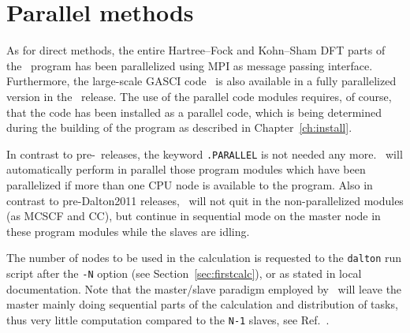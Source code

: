 \section{Parallel methods}\label{sec:parallel}

\begin{center}
\end{center}

As for direct methods, the entire Hartree--Fock and Kohn--Sham DFT parts of the \dalton\
program has been parallelized using MPI as
message passing interface.
Furthermore, the large-scale GASCI code \lucita\ 
is also available in a fully parallelized version in the \latestrelease\ release.
The use of the parallel code modules requires,
of course, that the code has been installed as a parallel
code\index{parallel calculation}, which is
being determined during the building of the program as described in
Chapter~\ref{ch:install}.

In contrast to pre-\dalton\ releases, the keyword \verb|.PARALLEL| is not needed any more.
\dalton\ will automatically perform in parallel those program modules which have been
parallelized if more than one CPU node is available to the program.
Also in contrast to pre-Dalton2011 releases, \dalton\ will not quit in the non-parallelized
modules (as MCSCF and CC), but continue in sequential mode on the master node in these
program modules while the slaves are idling.

%

The number of nodes to be used in the calculation is
requested to the 
\verb|dalton| run script after the \verb|-N| option (see
Section~\ref{sec:firstcalc}), or as stated in local
documentation. Note that the master/slave\index{master}
paradigm employed by 
\dalton\ will leave the master mainly doing sequential parts of the
calculation and distribution of tasks, thus very little computation
compared to the \verb|N-1| slaves, see
Ref.~\cite{pndjhapdkrthhkcpl253}.

